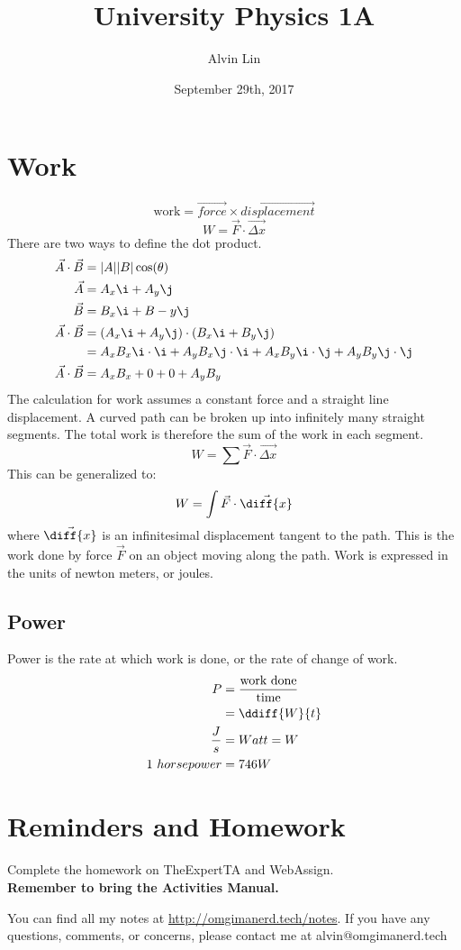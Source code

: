 \documentclass[letterpaper, 12pt]{math}
\title{University Physics 1A}
\author{Alvin Lin}
\date{September 29th, 2017}
\begin{document}
\maketitle

\section*{Work}
\[ \text{work} = \overrightarrow{force}\times\overrightarrow{displacement} \]
\[ W = \vec{F}\cdot\overrightarrow{\Delta x} \]
There are two ways to define the dot product.
\begin{align*}
  \vec{A}\cdot\vec{B} &= |A||B|\cos(\theta) \\
  \vec{A} &= A_x\i+A_y\j \\
  \vec{B} &= B_x\i+B-y\j \\
  \vec{A}\cdot\vec{B} &= (A_x\i+A_y\j)\cdot(B_x\i+B_y\j) \\
  &= A_xB_x\i\cdot\i+A_yB_x\j\cdot\i+A_xB_y\i\cdot\j+A_yB_y\j\cdot\j \\
  \vec{A}\cdot\vec{B} &= A_xB_x+0+0+A_yB_y
\end{align*}
The calculation for work assumes a constant force and a straight line
displacement. A curved path can be broken up into infinitely many straight
segments. The total work is therefore the sum of the work in each segment.
\[ W = \sum{\vec{F}\cdot\overrightarrow{\Delta x}} \]
This can be generalized to:
\[ W = \int\vec{F}\cdot\vec{\diff{x}} \]
where \( \vec{\diff{x}} \) is an infinitesimal displacement tangent to the
path. This is the work done by force \( \vec{F} \) on an object moving along
the path. Work is expressed in the units of newton meters, or joules.

\subsection*{Power}
Power is the rate at which work is done, or the rate of change of work.
\begin{align*}
  P &= \frac{\text{work done}}{\text{time}} \\
  &= \ddiff{W}{t} \\
  \frac{J}{s} &= Watt = W \\
  1~horsepower &= 746W
\end{align*}

\section*{Reminders and Homework}
Complete the homework on TheExpertTA and WebAssign. \\
\textbf{Remember to bring the Activities Manual.} \\

\begin{center}
  You can find all my notes at \url{http://omgimanerd.tech/notes}. If you have
  any questions, comments, or concerns, please contact me at
  alvin@omgimanerd.tech
\end{center}
\end{document}
